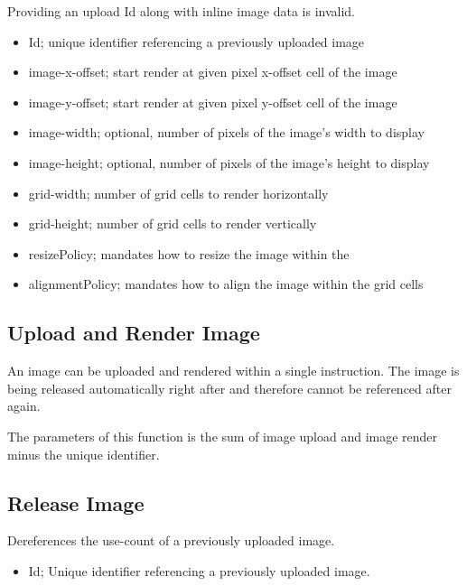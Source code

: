 \documentclass{article}
\begin{document}
Providing an upload Id along with inline image data is invalid.

\begin{itemize}
    \item Id; unique identifier referencing a previously uploaded image
    \item image-x-offset; start render at given pixel x-offset cell of the image
    \item image-y-offset; start render at given pixel y-offset cell of the image
    \item image-width; optional, number of pixels of the image's width to display
    \item image-height; optional, number of pixels of the image's height to display
    \item grid-width; number of grid cells to render horizontally
    \item grid-height; number of grid cells to render vertically
    \item resizePolicy; mandates how to resize the image within the
    \item alignmentPolicy; mandates how to align the image within the grid cells
\end{itemize}

\subsection{Upload and Render Image}

An image can be uploaded and rendered within a single instruction.
The image is being released automatically right after and therefore cannot be referenced after
again.

The parameters of this function is the sum of image upload and image render minus the unique
identifier.

\subsection{Release Image}

Dereferences the use-count of a previously uploaded image.

\begin{itemize}
    \item Id; Unique identifier referencing a previously uploaded image.
\end{itemize}
\end{document}

